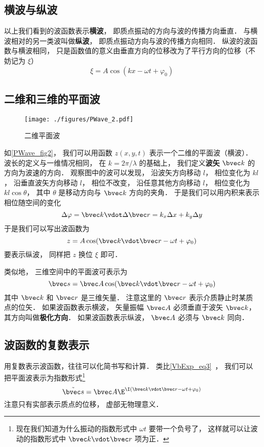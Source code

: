 \subsection{横波与纵波}
以上我们看到的波函数表示\textbf{横波}， 即质点振动的方向与波的传播方向垂直． 与横波相对的另一类波叫做\textbf{纵波}， 即质点振动方向与波的传播方向相同． 纵波的波函数与横波相同， 只是函数值的意义由垂直方向的位移改为了平行方向的位移（不妨记为 $\xi$）
\begin{equation}
\xi = A \cos(k x - \omega t + \varphi_0)
\end{equation}

\subsection{二维和三维的平面波}

\begin{figure}[ht]
\centering
\texttt{[image: ./figures/PWave\_2.pdf]}
\caption{二维平面波} \label{PWave_fig2}
\end{figure}

如\autoref{PWave_fig2}， 我们可以用函数 $z(x,y,t)$ 表示一个二维的平面波（横波）． 波长的定义与一维情况相同， 在 $k = 2\pi/\lambda$ 的基础上， 我们定义\textbf{波矢} $\bvec k$ 的方向为波速的方向．
观察图中的波可以发现， 沿波矢方向移动 $l$， 相位变化为 $kl$， 沿垂直波矢方向移动 $l$， 相位不改变， 沿任意其他方向移动 $l$， 相位变化为 $kl\cos\theta$， 其中 $\theta$ 是移动方向与 $\bvec k$ 方向的夹角． 于是我们可以用内积来表示相位随空间的变化
\begin{equation}
\Delta\varphi = \bvec k \vdot \Delta\bvec r = k_x \Delta x + k_y \Delta y
\end{equation}
于是我们可以写出波函数为
\begin{equation}\label{PWave_eq8}
z = A \cos(\bvec k \vdot \bvec r - \omega t + \varphi_0)
\end{equation}
要表示纵波， 同样把 $z$ 换位 $\xi$ 即可．

类似地， 三维空间中的平面波可表示为
\begin{equation}
\bvec s = \bvec A \cos(\bvec k \vdot \bvec r - \omega t + \varphi_0)
\end{equation}
其中 $\bvec k$ 和 $\bvec r$ 是三维矢量． 注意这里的 $\bvec r$ 表示介质静止时某质点的位矢． 如果波函数表示横波， 矢量振幅 $\bvec A$ 必须垂直于波矢 $\bvec k$， 其方向叫做\textbf{极化方向}． 如果波函数表示纵波， $\bvec A$ 必须与 $\bvec k$ 同向．

\subsection{波函数的复数表示}

用复数表示波函数，往往可以化简书写和计算． 类比\autoref{VbExp_eq3}~， 我们可以把平面波表示为指数形式\footnote{现在我们知道为什么振动的指数形式中 $\omega t$ 要带一个负号了， 这样就可以让波动的指数形式中 $\bvec k\vdot \bvec r$ 项为正．}
\begin{equation}
\tilde {\bvec s} = \bvec A \E^{\I( \bvec k \vdot \bvec r - \omega t + \varphi_0)}
\end{equation}
注意只有实部表示质点的位移， 虚部无物理意义．

